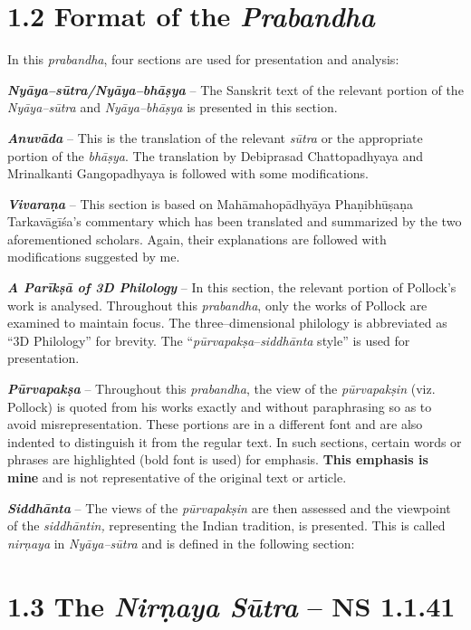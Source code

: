 \section*{1.2 Format of the {\it {\bfseries Prabandha}}}

In this \textit{prabandha}, four sections are used for presentation and analysis:

\textit{\textbf{Nyāya–sūtra/Nyāya–bhāṣya}} – The Sanskrit text of the relevant portion of the \textit{Nyāya–sūtra }and \textit{Nyāya–bhāṣya} is presented in this section.

\textit{\textbf{Anuvāda}} – This is the translation of the relevant \textit{sūtra} or the appropriate portion of the \textit{bhāṣya}. The translation by Debiprasad Chattopadhyaya and Mrinalkanti Gangopadhyaya is followed with some modifications.

\textit{\textbf{Vivaraṇa}} – This section is based on Mahāmahopādhyāya Phaṇibhūṣaṇa Tarkavāgīśa’s commentary which has been translated and summarized by the two aforementioned scholars. Again, their explanations are followed with modifications suggested by me.

\textbf{\textit{A Parīkṣā of 3D Philology}} – In this section, the relevant portion of Pollock’s work is analysed. Throughout this \textit{prabandha}, only the works of Pollock are examined to maintain focus. The three–dimensional philology is abbreviated as “3D Philology” for brevity. The “\textit{pūrvapakṣa}–\textit{siddhānta} style” is used for presentation.

\textit{\textbf{Pūrvapakṣa}} – Throughout this \textit{prabandha}, the view of the \textit{pūrvapakṣin} (viz. Pollock) is quoted from his works exactly and without paraphrasing so as to avoid misrepresentation. These portions are in a different font and are also indented to distinguish it from the regular text. In such sections, certain words or phrases are highlighted (bold font is used) for emphasis. \textbf{This emphasis is mine} and is not representative of the original text or article.

\textit{\textbf{Siddhānta}} – The views of the \textit{pūrvapakṣin} are then assessed and the viewpoint of the \textit{siddhāntin,} representing the Indian tradition, is presented. This is called \textit{nirṇaya} in \textit{Nyāya–sūtra} and is defined in the following section:


\section*{1.3 The {\it {\bfseries Nirṇaya Sūtra}} – NS 1.1.41}

